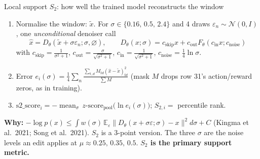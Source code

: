 \documentclass[aspectratio=169,11pt]{beamer}
\begin{document}
\begin{frame}{Local support $S_2$: how well the trained model reconstructs the window}
\begin{enumerate}
\item Normalise the window: $\tilde x$. For $\sigma\in\{0.16,\,0.5,\,2.4\}$ and 4 draws $\varepsilon_n\sim\mathcal N(0,I)$, one \emph{unconditional} denoiser call
\[
\hat x=D_\theta(\tilde x+\sigma\varepsilon_n;\sigma,\varnothing),\qquad
D_\theta(x;\sigma)=c_{\text{skip}}x+c_{\text{out}}F_\theta(c_{\text{in}}x;c_{\text{noise}})
\]
with $c_{\text{skip}}=\frac{1}{\sigma^2+1}$, $c_{\text{out}}=\frac{\sigma}{\sqrt{\sigma^2+1}}$, $c_{\text{in}}=\frac{1}{\sqrt{\sigma^2+1}}$, $c_{\text{noise}}=\tfrac14\ln\sigma$.
\item Error $e_i(\sigma)=\frac14\sum_n \frac{\sum_{t,d}M_{td}(\hat x-\tilde x)^2_{td}}{\sum M}$ (mask $M$ drops row 31's action/reward zeros, as in training).
\item $\text{s2\_score}_i=-\operatorname{mean}_\sigma\, z\text{-score}_{\text{pool}}\big(\ln e_i(\sigma)\big)$; \quad $S_{2,i}=$ percentile rank.
\end{enumerate}
\vspace{0.3em}
\textbf{Why:} $-\log p(x)\le\int w(\sigma)\,\mathbb E_\varepsilon\lVert D_\theta(x+\sigma\varepsilon;\sigma)-x\rVert^2d\sigma+C$ (Kingma et al.\ 2021; Song et al.\ 2021). $S_2$ is a 3-point version.
The three $\sigma$ are the noise levels an edit applies at $\mu\approx0.25,\,0.35,\,0.5$.
\textbf{$S_2$ is the primary support metric.}
\end{frame}
\end{document}
